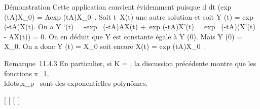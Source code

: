 \documentclass[]{article}
\begin{document}
Démonstration Cette application convient évidemment puisque  d
\over dt (exp~
(tA)X\_0) = Aexp (tA)X\_0~.
Soit t\mapsto~X(t) une autre solution et soit Y (t)
= exp~ (-tA)X(t). On a Y `(t) =
-exp~ (-tA)AX(t) +\
exp (-tA)X'(t) = exp~ (-tA)(X'(t) - AX(t)) =
0. On en déduit que Y est constante égale à Y (0). Mais Y (0) =
X\_0. On a donc Y (t) = X\_0 soit encore X(t)
= exp (tA)X\_0~.

Remarque~11.4.3 En particulier, si K = , la discussion précédente
montre que les fonctions
x\_1,\\ldots,x\_p~
sont des exponentielles polynômes.

{[}
{[}
{[}
{[}
\end{document}
